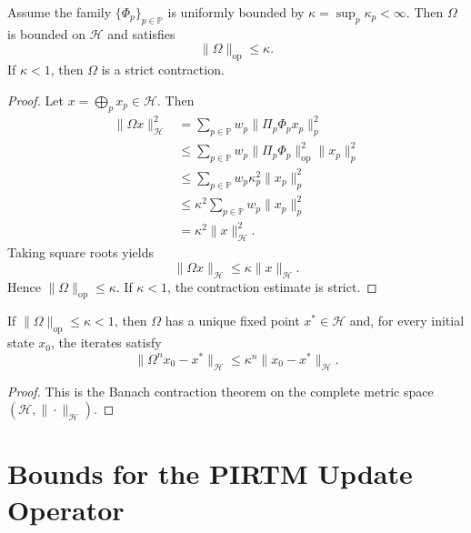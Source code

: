 \documentclass[12pt,a4paper]{article}
\theoremstyle{definition}
\theoremstyle{plain}
\theoremstyle{remark}
\begin{document}
\begin{proposition}
Assume the family $\{\Phi_p\}_{p\in\mathbb{P}}$ is uniformly bounded by
$\kappa = \sup_p \kappa_p < \infty$. Then $\Omega$ is bounded on $\mathcal{H}$ and
satisfies
\begin{equation}
\|\Omega\|_{\mathrm{op}} \le \kappa.
\end{equation}
If $\kappa < 1$, then $\Omega$ is a strict contraction.
\end{proposition}

\begin{proof}
Let $x = \bigoplus_p x_p \in \mathcal{H}$. Then
\begin{align}
\|\Omega x\|_{\mathcal{H}}^2
&= \sum_{p\in\mathbb{P}} w_p \|\Pi_p\Phi_p x_p\|_p^2 \\
&\le \sum_{p\in\mathbb{P}} w_p \|\Pi_p\Phi_p\|_{\mathrm{op}}^2 \|x_p\|_p^2 \\
&\le \sum_{p\in\mathbb{P}} w_p \kappa_p^2 \|x_p\|_p^2 \\
&\le \kappa^2 \sum_{p\in\mathbb{P}} w_p \|x_p\|_p^2 \\
&= \kappa^2 \|x\|_{\mathcal{H}}^2.
\end{align}
Taking square roots yields
\begin{equation}
\|\Omega x\|_{\mathcal{H}} \le \kappa \|x\|_{\mathcal{H}}.
\end{equation}
Hence $\|\Omega\|_{\mathrm{op}} \le \kappa$. If $\kappa<1$, the contraction
estimate is strict.
\end{proof}

\begin{corollary}
If $\|\Omega\|_{\mathrm{op}} \le \kappa < 1$, then $\Omega$ has a unique fixed point
$x^\ast \in \mathcal{H}$ and, for every initial state $x_0$, the iterates satisfy
\begin{equation}
\|\Omega^n x_0 - x^\ast\|_{\mathcal{H}} \le \kappa^n \|x_0-x^\ast\|_{\mathcal{H}}.
\end{equation}
\end{corollary}

\begin{proof}
This is the Banach contraction theorem on the complete metric space
$(\mathcal{H},\|\cdot\|_{\mathcal{H}})$.
\end{proof}

\section{Bounds for the PIRTM Update Operator}
\end{document}
